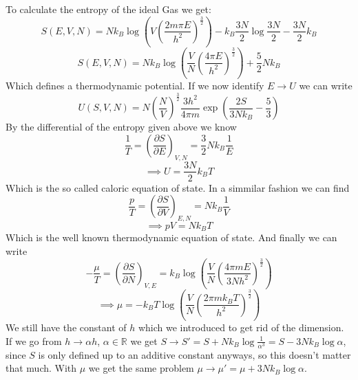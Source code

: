 \documentclass{report}
\begin{document}
To calculate the entropy of the ideal Gas we get: \[
  S\left( E,V,N \right) = N k_B \log\left( V \left( \frac{2m \pi E}{h^2} \right) ^{\frac{3}{2}} \right) - k_B \frac{3N}{2} \log \frac{3N}{2} - \frac{3N}{2} k_B
\] \[
S\left( E,V,N \right) = Nk_B \log\left( \frac{V}{N} \left( \frac{4\pi E}{h^2} \right) ^{\frac{3}{2}} \right) + \frac{5}{2} N k_B
\]
Which defines a thermodynamic potential. If we now identify $E\to U$ we can write \[
  U\left( S,V,N \right) = N\left( \frac{N}{V} \right) ^{\frac{3}{2}} \frac{3h^2}{4\pi m} \exp\left( \frac{2S}{3 Nk_B} - \frac{5}{3} \right) 
\] 
By the differential of the entropy given above we know \[
  \frac{1}{T} = \left( \frac{\partial S  }{\partial E} \right) _{V,N} = \frac{3}{2} N k_B \frac{1}{E}
\] \[
\implies U = \frac{3N}{2} k_B T
\] 
Which is the so called caloric equation of state. In a simmilar fashion we can find \[
  \frac{p}{T} = \left( \frac{\partial S}{\partial V} \right) _{E,N} = N k_B \frac{1}{V}
\] \[
\implies pV = Nk_B T
\] Which is the well known thermodynamic equation of state. And finally we can write \[
-\frac{\mu}{T} = \left( \frac{\partial S}{\partial N} \right) _{V,E} = k_B \log\left( \frac{V}{N} \left( \frac{4 \pi m E}{3N h^2} \right) ^{\frac{3}{2}} \right) 
\] \[
\implies \mu = -k_B T \log\left( \frac{V}{N} \left( \frac{2\pi m k_B T}{h^2} \right) ^{\frac{3}{2}} \right) 
\] 
We still have the constant of $h$ which we introduced to get rid of the dimension. If we go from $h \to \alpha h$, $\alpha \in \mathbb{R}$ we get $S \to S' = S + N k_B \log \frac{1}{\alpha ^{3}} = S - 3Nk_B \log \alpha$, since $S$ is only defined up to an additive constant anyways, so this doesn't matter that much. With $\mu$ we get the same problem $\mu \to  \mu' = \mu + 3N k_B \log \alpha$.
\end{document}
